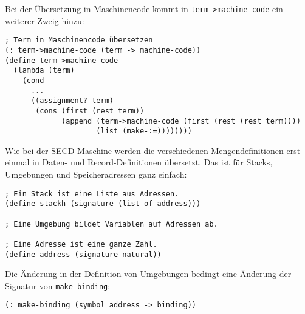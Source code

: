 Bei der Übersetzung in Maschinencode kommt in
\lstinline{term->machine-code} ein weiterer Zweig hinzu:
%
\begin{lstlisting}
; Term in Maschinencode übersetzen
(: term->machine-code (term -> machine-code))
(define term->machine-code
  (lambda (term)
    (cond
      ...
      ((assignment? term)
       (cons (first (rest term))
             (append (term->machine-code (first (rest (rest term))))
                     (list (make-:=))))))))
\end{lstlisting}
%
Wie bei der SECD-Maschine werden die verschiedenen Mengendefinitionen
erst einmal in Daten- und Record-Definitionen übersetzt.  Das ist für
Stacks, Umgebungen und Speicheradressen ganz einfach:
%
\begin{lstlisting}
; Ein Stack ist eine Liste aus Adressen.
(define stackh (signature (list-of address)))

; Eine Umgebung bildet Variablen auf Adressen ab.

; Eine Adresse ist eine ganze Zahl.
(define address (signature natural))
\end{lstlisting}
%
Die Änderung in der Definition von Umgebungen bedingt eine Änderung
der Signatur von \lstinline{make-binding}:
%
\begin{lstlisting}
(: make-binding (symbol address -> binding))
\end{lstlisting}

